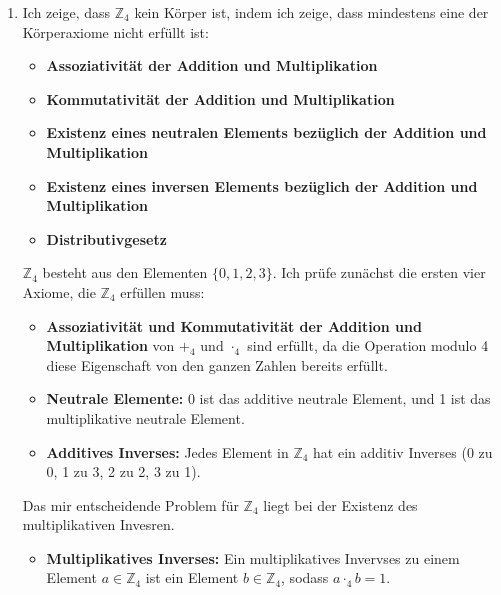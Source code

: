\documentclass[a4paper]{scrartcl}
\begin{document}
\begin{enumerate}[label=\alph*)]
  \item Ich zeige, dass $\mathbb{Z}_4$ kein Körper ist, indem ich zeige, dass mindestens eine der Körperaxiome nicht erfüllt ist:
  \begin{itemize}
    \item \textbf{Assoziativität der Addition und Multiplikation}
    \item \textbf{Kommutativität der Addition und Multiplikation}
    \item \textbf{Existenz eines neutralen Elements bezüglich der Addition und Multiplikation}
    \item \textbf{Existenz eines inversen Elements bezüglich der Addition und Multiplikation}
    \item \textbf{Distributivgesetz}
  \end{itemize}

  $\mathbb{Z}_4$ besteht aus den Elementen $\{0, 1, 2, 3\}$. Ich prüfe zunächst die ersten vier Axiome, die $\mathbb{Z}_4$ erfüllen muss:
  \begin{itemize}
    \item \textbf{Assoziativität und Kommutativität der Addition und Multiplikation} von $+_4 \text{ und } \cdot_4$ sind erfüllt, da die Operation modulo 4 diese Eigenschaft von den ganzen Zahlen bereits erfüllt.
    \item \textbf{Neutrale Elemente:} 0 ist das additive neutrale Element, und 1 ist das multiplikative neutrale Element.
    \item \textbf{Additives Inverses:} Jedes Element in $\mathbb{Z}_4$ hat ein additiv Inverses (0 zu 0, 1 zu 3, 2 zu 2, 3 zu 1).
  \end{itemize}
  Das mir entscheidende Problem für $\mathbb{Z}_4$ liegt bei der Existenz des multiplikativen Invesren. 
  \begin{itemize}
    \item \textbf{Multiplikatives Inverses:} Ein multiplikatives Invervses zu einem Element $a \in \mathbb{Z}_4$ ist ein Element $b \in \mathbb{Z}_4$, sodass $a \cdot_4 b = 1$.
  \end{itemize}


\end{enumerate}
\end{document}
